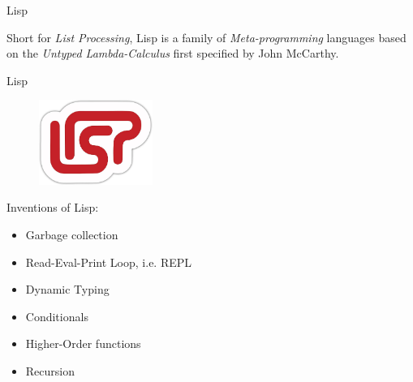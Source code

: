 \documentclass[pdf]{beamer}
\begin{document}
\begin{frame}{Lisp}
  \begin{figure}[H]
    \centering
    \hspace{0.3cm}
  \end{figure}
  Short for \textit{List Processing}, Lisp is a family of \textit{Meta-programming} languages based on the \textit{Untyped Lambda-Calculus} first specified by John McCarthy.


\end{frame}
\begin{frame}{Lisp}
  \begin{figure}[H]
    \centering
    \includegraphics[width=0.33\textwidth]{LISP}
  \end{figure}
  Inventions of Lisp:
  \begin{itemize}
  \item Garbage collection
  \item Read-Eval-Print Loop, i.e. REPL
  \item Dynamic Typing
  \item Conditionals
  \item Higher-Order functions
  \item Recursion
  \end{itemize}
\end{frame}
\end{document}
